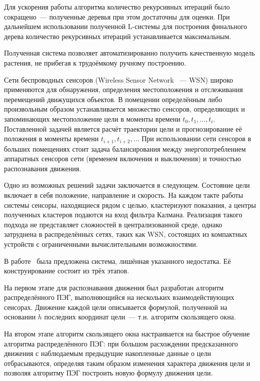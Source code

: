 Для ускорения работы алгоритма количество рекурсивных итераций было сокращено~--- полученные деревья при этом достаточны для оценки. При дальнейшем использовании полученной L-системы для построения финального дерева количество рекурсивных итераций устанавливается максимальным.

Полученная система позволяет автоматизированно получить качественную модель растения, не прибегая к трудоёмкому ручному построению.

Сети беспроводных сенсоров (Wireless Sensor Network ~--- WSN) широко применяются для обнаружения, определения местоположения и отслеживания перемещений движущихся объектов. В помещении определённым либо произвольным образом устанавливается множество сенсоров, определяющих и запоминающих местоположение цели в моменты времени $t_0, t_1, ..., t_i$. Поставленной задачей является расчёт траектории цели и прогнозирование её положения в моменты времени $t_{i+1}, t_{i+2}, ...$ При использовании сети сенсоров в больших помещениях стоит задача балансирования между энергопотреблением аппаратных сенсоров сети (временем включения и выключения) и точностью распознавания движения.

Одно из возможных решений задачи заключается в следующем. Состояние цели включает в себя положение, направление и скорость. На каждом такте работы системы сенсоры, находящиеся рядом с целью, кластеризуют показания, а центры полученных кластеров подаются на вход фильтра Калмана. Реализация такого подхода не представляет сложностей в централизованной среде, однако затруднена в распределённых сетях, таких как WSN, состоящих из компактных устройств с ограниченными вычислительными возможностями.

В работе~\cite{Dai:2009:ETA:1726588.1727798} была предложена система, лишённая указанного недостатка. Её конструирование состоит из трёх этапов.

На первом этапе для распознавания движения был разработан алгоритм распределённого ПЭГ, выполняющийся на нескольких взаимодействующих сенсорах. Движение каждой цели описывается формулой, полученной на основании $h$ последних координат цели~--- т.н. алгоритм скользящего окна.

На втором этапе алгоритм скользящего окна настраивается на быстрое обучение алгоритма распределённого ПЭГ: при большом расхождении предсказанного движения с наблюдаемым предыдущие накопленные данные о цели отбрасываются, определяя таким образом изменения характера движения цели и позволяя алгоритму ПЭГ построить новую формулу движения цели.

